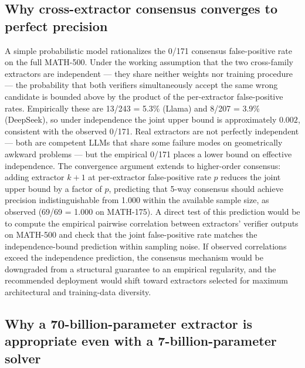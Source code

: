 \documentclass[11pt]{article}
\begin{document}
\subsection{Why cross-extractor consensus converges to perfect precision}

A simple probabilistic model rationalizes the 0/171 consensus false-positive rate on the full MATH-500. Under the working assumption that the two cross-family extractors are independent --- they share neither weights nor training procedure --- the probability that both verifiers simultaneously accept the same wrong candidate is bounded above by the product of the per-extractor false-positive rates. Empirically these are 13/243 = 5.3\% (Llama) and 8/207 = 3.9\% (DeepSeek), so under independence the joint upper bound is approximately $0.002$, consistent with the observed 0/171. Real extractors are not perfectly independent --- both are competent LLMs that share some failure modes on geometrically awkward problems \citep{kim2025correlated} --- but the empirical 0/171 places a lower bound on effective independence. The convergence argument extends to higher-order consensus: adding extractor $k+1$ at per-extractor false-positive rate $p$ reduces the joint upper bound by a factor of $p$, predicting that 5-way consensus should achieve precision indistinguishable from 1.000 within the available sample size, as observed (69/69 = 1.000 on MATH-175). A direct test of this prediction would be to compute the empirical pairwise correlation between extractors' verifier outputs on MATH-500 and check that the joint false-positive rate matches the independence-bound prediction within sampling noise. If observed correlations exceed the independence prediction, the consensus mechanism would be downgraded from a structural guarantee to an empirical regularity, and the recommended deployment would shift toward extractors selected for maximum architectural and training-data diversity.

\subsection{Why a 70-billion-parameter extractor is appropriate even with a 7-billion-parameter solver}
\end{document}
